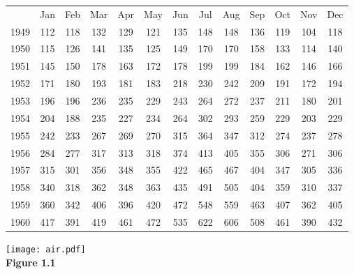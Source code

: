 \documentclass[a4paper,12pt,freqn]{report}
\theoremstyle{plain}
\begin{document}
\begin{tabular}{|c|c|c|c|c|c|c|c|c|c|c|c|c|}
  \hline

     & Jan& Feb &Mar &Apr &May &Jun &Jul &Aug &Sep &Oct &Nov &Dec \\

1949 &112& 118& 132& 129& 121 &135 &148 &148 &136 &119 &104 &118 \\

1950 &115 &126 &141 &135 &125 &149 &170 &170 &158 &133 &114 &140 \\

1951 &145 &150 &178 &163 &172 &178 &199 &199 &184 &162 &146 &166 \\

1952 &171 &180 &193 &181 &183 &218 &230 &242 &209 &191 &172 &194 \\

1953 &196 &196 &236 &235 &229 &243 &264 &272 &237 &211 &180 &201 \\

1954 &204 &188 &235 &227 &234 &264 &302 &293 &259 &229 &203 &229 \\

1955 &242 &233 &267 &269 &270 &315 &364 &347 &312 &274 &237 &278 \\

1956 &284 &277 &317 &313 &318 &374 &413 &405 &355 &306 &271 &306 \\

1957 &315 &301 &356 &348 &355 &422 &465 &467 &404 &347 &305 &336 \\

1958 &340 &318 &362 &348 &363 &435 &491 &505 &404 &359 &310 &337 \\

1959 &360 &342 &406 &396 &420 &472 &548 &559 &463 &407 &362 &405 \\

1960 &417 &391 &419 &461 &472 &535 &622 &606 &508 &461 &390 &432 \\
\hline
\end{tabular}
\bigskip

  \begin{center}
  \texttt{[image: air.pdf]}\\


  \textbf{Figure 1.1}
\end{center}
\end{document}
